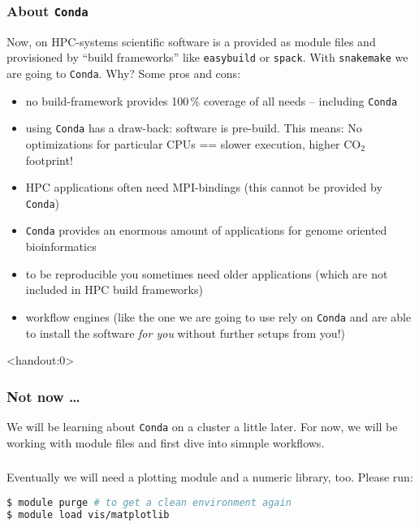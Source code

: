 \begin{frame}[fragile]
  \frametitle{About \texttt{Conda}}
  Now, on HPC-systems scientific software is a provided as module files and provisioned by ``build frameworks'' like \texttt{easybuild} or \texttt{spack}. With \texttt{snakemake} we are going to \texttt{Conda}. Why? Some pros and cons:\footnotesize
  \begin{itemize}[<+->]
   \item no build-framework provides 100\,\% coverage of all needs -- including \texttt{Conda}
   \item using \texttt{Conda} has a draw-back: software is pre-build. This means: No optimizations for particular CPUs == slower execution, higher CO$_2$ footprint!
   \item HPC applications often need MPI-bindings (this cannot be provided by \texttt{Conda})
   \item \texttt{Conda} provides an enormous amount of applications for genome oriented bioinformatics
   \item to be reproducible you sometimes need older applications (which are not included in HPC build frameworks)
   \item workflow engines (like the one we are going to use rely on \texttt{Conda} and are able to install the software \emph{for you} without further setups from you!)
  \end{itemize}
  \pause
\end{frame}

\begin{frame}<handout:0>
  \frametitle{Not now \ldots}
  We will be learning about \texttt{Conda} on a cluster a little later. For now, we will be working with module files and first dive into simnple workflows.
\end{frame}


\begin{frame}[fragile]
  \frametitle{}
  Eventually we will need a plotting module and a numeric library, too. Please run:
  \begin{lstlisting}[language=Bash, style=Shell]
$ module purge # to get a clean environment again
$ module load vis/matplotlib
  \end{lstlisting}
  \pause
\end{frame}

